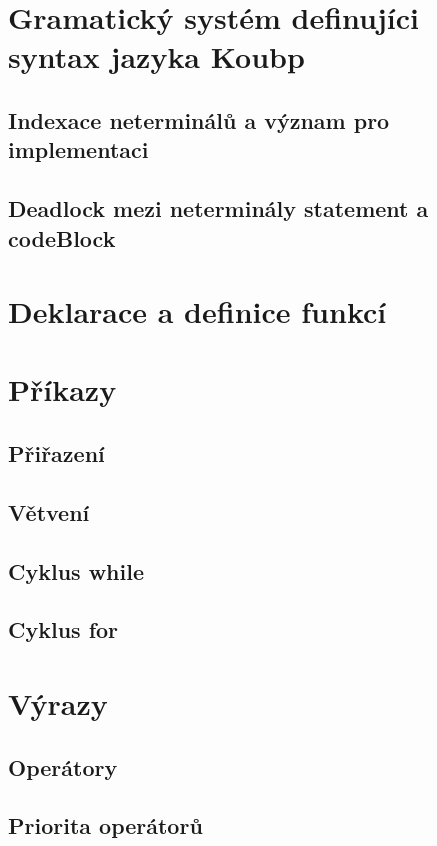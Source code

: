 \section{Gramatický systém definujíci syntax jazyka Koubp}

\subsection*{Indexace neterminálů a význam pro implementaci} 

\subsection*{Deadlock mezi neterminály statement a codeBlock}

\section{Deklarace a definice funkcí}

\section{Příkazy}

\subsection*{Přiřazení}

\subsection*{Větvení}

\subsection*{Cyklus while}

\subsection*{Cyklus for}

\section{Výrazy}

\subsection*{Operátory}

\subsection*{Priorita operátorů}

